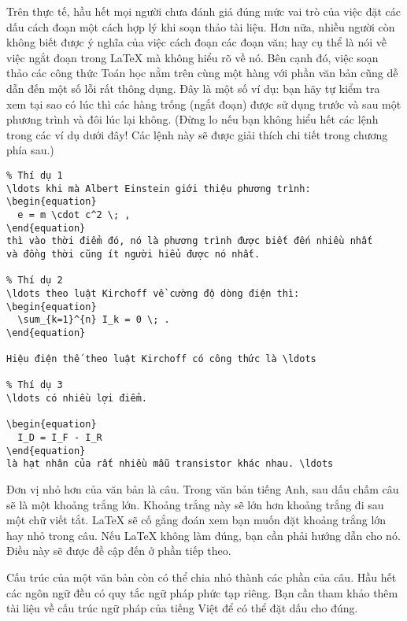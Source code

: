 Trên thực tế, hầu hết mọi người chưa đánh giá đúng mức vai trò của việc đặt các dấu cách đoạn một cách hợp lý khi soạn thảo tài liệu. Hơn nữa, nhiều người còn không biết được ý nghĩa của việc cách đoạn các đoạn văn; hay cụ thể là nói
về việc ngắt đoạn trong \LaTeX{} mà không hiểu rõ về nó. Bên cạnh đó, việc soạn thảo các công thức Toán học nằm trên cùng một hàng với phần văn bản cũng dễ dẫn đến một số lỗi rất thông dụng. Đây là một số ví dụ: bạn hãy tự kiểm tra xem tại sao có lúc thì các hàng trống (ngắt đoạn) được sử dụng trước và sau một phương trình và đôi lúc lại không. (Đừng lo nếu
bạn không hiểu hết các lệnh trong các ví dụ dưới đây! Các lệnh này sẽ được giải thích chi tiết trong chương phía sau.)

\begin{code}
\begin{verbatim}
% Thí dụ 1
\ldots khi mà Albert Einstein giới thiệu phương trình:
\begin{equation}
  e = m \cdot c^2 \; ,
\end{equation}
thì vào thời điểm đó, nó là phương trình được biết đến nhiều nhất
và đồng thời cũng ít người hiểu được nó nhất.

% Thí dụ 2
\ldots theo luật Kirchoff về cường độ dòng điện thì:
\begin{equation}
  \sum_{k=1}^{n} I_k = 0 \; .
\end{equation}

Hiệu điện thế theo luật Kirchoff có công thức là \ldots

% Thí dụ 3
\ldots có nhiều lợi điểm.

\begin{equation}
  I_D = I_F - I_R
\end{equation}
là hạt nhân của rất nhiều mẫu transistor khác nhau. \ldots
\end{verbatim}
\end{code}

Đơn vị nhỏ hơn của văn bản là câu. Trong văn bản tiếng Anh, sau dấu chấm câu sẽ là một khoảng trắng lớn. Khoảng trắng này sẽ lớn hơn khoảng trắng đi sau một chữ viết tắt. \LaTeX{} sẽ cố gắng đoán xem bạn muốn đặt khoảng trắng lớn hay nhỏ trong câu. Nếu \LaTeX{} không làm đúng, bạn cần phải hướng dẫn cho nó. Điều này sẽ được đề cập đến ở phần tiếp theo.

Cấu trúc của một văn bản còn có thể chia nhỏ thành các phần của câu. Hầu hết các ngôn ngữ đều có quy tắc ngữ pháp phức tạp riêng. Bạn cần tham khảo thêm tài liệu về cấu trúc ngữ pháp của tiếng Việt để có thể đặt dấu cho đúng.

